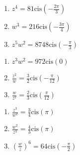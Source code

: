 \documentclass{ximera}
\begin{document}
\begin{multicols}{3} 

\begin{enumerate}

\setcounter{enumi}{\value{HW}}

\item $z^{4} = 81\text{cis}\left(-\frac{2\pi}{3}\right)$
\item $w^{3} = 216\text{cis}\left(-\frac{3\pi}{4}\right)$
\item $z^{5}w^{2} = 8748\text{cis}\left(-\frac{\pi}{3}\right)$

\setcounter{HW}{\value{enumi}}

\end{enumerate}

\end{multicols}

\begin{multicols}{3} 

\begin{enumerate}

\setcounter{enumi}{\value{HW}}

\item $z^3w^2 = 972 \text{cis}(0)$
\item $\frac{z^2}{w} =\frac{3}{2}\text{cis}\left(-\frac{\pi}{12}\right)$
\item $\frac{w}{z^2} =\frac{2}{3}\text{cis}\left(\frac{\pi}{12}\right)$

\setcounter{HW}{\value{enumi}}

\end{enumerate}

\end{multicols}

\begin{multicols}{3} 

\begin{enumerate}

\setcounter{enumi}{\value{HW}}

\item $\frac{z^3}{w^2} =\frac{3}{4}\text{cis}(\pi)$
\item $\frac{w^2}{z^3} =\frac{4}{3}\text{cis}(\pi)$
\item $\left(\frac{w}{z}\right)^6 =64\text{cis}\left(-\frac{\pi}{2} \right)$

\setcounter{HW}{\value{enumi}}

\end{enumerate}

\end{multicols}
\end{document}
